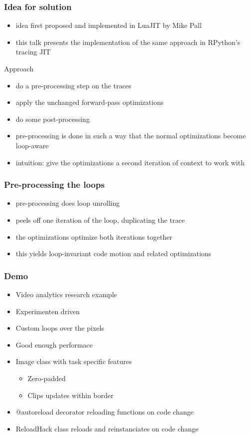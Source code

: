 \documentclass[utf8x]{beamer}
\begin{document}
\begin{frame}
  \frametitle{Idea for solution}
  \begin{itemize}
      \item idea first proposed and implemented in LuaJIT by Mike Pall
      \item this talk presents the implementation of the same approach in RPython's tracing JIT
  \end{itemize}
  \pause
  \begin{block}{Approach}
      \begin{itemize}
          \item do a pre-processing step on the traces
          \item apply the unchanged forward-pass optimizations
          \item do some post-processing
          \item pre-processing is done in such a way that the normal optimizations become loop-aware
          \item intuition: give the optimizations a second iteration of context to work with
      \end{itemize}
  \end{block}
\end{frame}

\begin{frame}
  \frametitle{Pre-processing the loops}
  \begin{itemize}
      \item pre-processing does loop unrolling
      \item peels off one iteration of the loop, duplicating the trace
      \item the optimizations optimize both iterations together
      \item this yields loop-invariant code motion and related optimizations
  \end{itemize}
\end{frame}

\begin{frame}
  \frametitle{Demo}
  \vfill
  \begin{itemize}
      \item Video analytics research example
      \item Experimenten driven
      \item Custom loops over the pixels
      \item Good enough performace
  \end{itemize}
  \vfill
  \begin{itemize}
      \item Image class with task specific features
        \begin{itemize}
            \item Zero-padded
            \item Clips updates within border
        \end{itemize}
      \item @autoreload decorator reloading functions on code change
      \item ReloadHack class reloads and reinstanciates on code change
  \end{itemize}
  \vfill
\end{frame}
\end{document}
